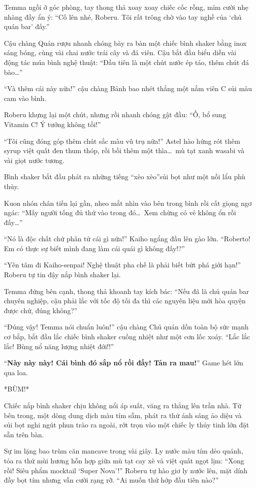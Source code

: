 \documentclass[../main.tex]{subfiles}
\begin{document}
Temma ngồi ở góc phòng, tay thong thả xoay xoay chiếc cốc rỗng, mỉm cười nhẹ nhàng đầy ẩn ý: ``Cố lên nhé, Roberu. Tôi rất trông chờ vào tay nghề của `chủ quán bar' đấy.''

Cậu chàng Quán rượu nhanh chóng bày ra bàn một chiếc bình shaker bằng inox sáng bóng, cùng vài chai nước trái cây và đá viên. Cậu bắt đầu biểu diễn vài động tác múa bình nghệ thuật: ``Đầu tiên là một chút nước ép táo, thêm chút đá bào\dots''

``Và thêm cái này nữa!'' cậu chàng Bảnh bao nhét thẳng một nắm viên C sủi màu cam vào bình.

Roberu khựng lại một chút, nhưng rồi nhanh chóng gật đầu: ``Ồ, bổ sung Vitamin C! Ý tưởng không tồi!''

``Tôi cũng đóng góp thêm chút sắc màu vũ trụ nữa!'' Astel hào hứng rót thêm syrup việt quất đen thum thóp, rồi bồi thêm một thìa\dots\ mù tạt xanh wasabi và vài giọt nước tương.

Bình shaker bắt đầu phát ra những tiếng ``xèo xèo''sủi bọt như một nồi lẩu phù thủy.

Kuon nhón chân tiến lại gần, nheo mắt nhìn vào bên trong bình rồi cất giọng ngơ ngác: ``Mấy người tống đủ thứ vào trong đó\dots\ Xem chừng có vẻ không ổn rồi đấy\dots''

``Nó là độc chất chứ phân tử cái gì nữa!'' Kaiho ngẩng đầu lên gào lớn. ``Roberto! Em có thực sự biết mình đang làm cái quái gì không đấy!?''

``Yên tâm đi Kaiho-senpai! Nghệ thuật pha chế là phải biết bứt phá giới hạn!'' Roberu tự tin đậy nắp bình shaker lại.

Temma đứng bên cạnh, thong thả khoanh tay kích bác: ``Nếu đã là chủ quán bar chuyên nghiệp, cậu phải lắc với tốc độ tối đa thì các nguyên liệu mới hòa quyện được chứ, đúng không?''

``Đúng vậy! Temma nói chuẩn luôn!'' cậu chàng Chủ quán dồn toàn bộ sức mạnh cơ bắp, bắt đầu lắc chiếc bình shaker cuồng nhiệt như một cơn lốc xoáy. ``Lắc lắc lắc! Bùng nổ năng lượng nhiệt đới!!''

``\textbf{Này này này! Cái bình đó sắp nổ rồi đấy! Tản ra mau!}'' Game hét lớn qua loa.

*BÙM!*

Chiếc nắp bình shaker chịu không nổi áp suất, văng ra thẳng lên trần nhà. Từ bên trong, một dòng dung dịch màu tím sẫm, phát ra thứ ánh sáng ảo diệu và sủi bọt nghi ngút phun trào ra ngoài, rớt trọn vào một chiếc ly thủy tinh lớn đặt sẵn trên bàn.

Sự im lặng bao trùm căn mancave trong vài giây. Ly nước màu tím dẻo quánh, tỏa ra thứ mùi hương hỗn hợp giữa mù tạt cay xè và việt quất ngọt lịm: ``Xong rồi! Siêu phẩm mocktail `Super Nova'!'' Roberu tự hào giơ ly nước lên, mặt dính đầy bọt tím nhưng vẫn cười rạng rỡ. ``Ai muốn thử hớp đầu tiên nào?''
\end{document}
